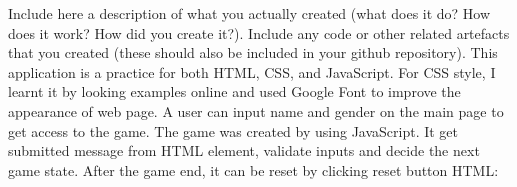 \documentclass[a4paper, 11pt]{report}
\begin{document}
Include here a description of what you actually created (what does it do? How does it work? How did you create it?). Include any code or other related artefacts that you created (these should also be included in your github repository).
\newline
\newline
This application is a practice for both HTML, CSS, and JavaScript. For CSS style, I learnt it by looking examples online and used Google Font to improve the appearance of web page. A user can input name and gender on the main page to get access to the game. The game was created by using JavaScript. It get submitted message from HTML element, validate inputs and decide the next game state. After the game end, it can be reset by clicking reset button
\newline
\newline
HTML:
\newline
\end{document}
